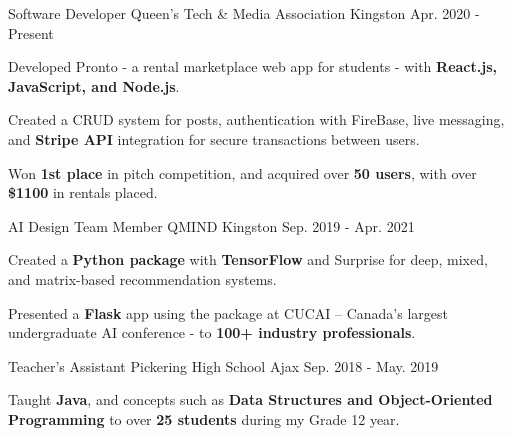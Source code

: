 

\begin{cventries}

  \cventry
    {Software Developer} %
    {Queen’s Tech \& Media Association} %
    {Kingston} %
    {Apr. 2020 - Present} %
    {
      \begin{cvitems} %
        \item {Developed Pronto - a rental marketplace web app for students - with \textbf{React.js, JavaScript, and Node.js}.}
        \item {Created a CRUD system for posts, authentication with FireBase, live messaging, and \textbf{Stripe API} integration for secure transactions between users.}
        \item {Won \textbf{1st place} in pitch competition, and acquired over \textbf{50 users}, with over \textbf{\$1100} in rentals placed.}
      \end{cvitems}
    }

  \cventry
    {AI Design Team Member} %
    {QMIND} %
    {Kingston} %
    {Sep. 2019 - Apr. 2021} %
    {
      \begin{cvitems} %
        \item {Created a \textbf{Python package} with \textbf{TensorFlow} and Surprise for deep, mixed, and matrix-based recommendation systems.}
        \item {Presented a \textbf{Flask} app using the package at CUCAI – Canada’s largest undergraduate AI conference - to \textbf{100+ industry professionals}.}
      \end{cvitems}
    }

  \cventry
    {Teacher's Assistant} %
    {Pickering High School} %
    {Ajax} %
    {Sep. 2018 - May. 2019} %
    {
      \begin{cvitems} %
        \item {Taught \textbf{Java}, and concepts such as \textbf{Data Structures and Object-Oriented Programming} to over \textbf{25 students} during my Grade 12 year.}
      \end{cvitems}
    }


\end{cventries}
